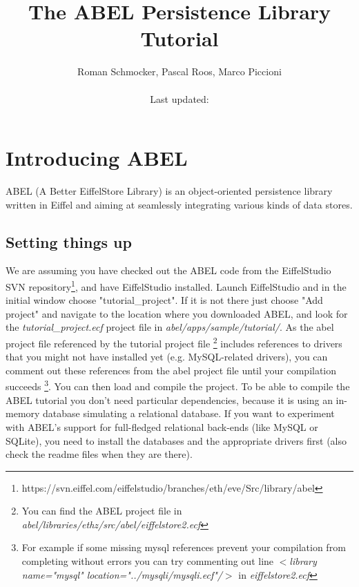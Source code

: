 \documentclass[a4paper,12pt]{report}
\title {The ABEL Persistence Library Tutorial}
\author {
	Roman Schmocker, Pascal Roos, Marco Piccioni\\\\
	Last updated:
}
\newcommand{\blankpage}{
\newpage
\thispagestyle{empty}
\mbox{}
\newpage
}
\begin{document}
\maketitle


%


\tableofcontents



%

\chapter{Introducing ABEL}
ABEL (A Better EiffelStore Library) is an object-oriented persistence library written in Eiffel and aiming at seamlessly integrating various kinds of data stores.
 
\section{Setting things up}
We are assuming you have checked out the ABEL code from the EiffelStudio SVN repository\footnote{https://svn.eiffel.com/eiffelstudio/branches/eth/eve/Src/library/abel}, and have EiffelStudio installed. Launch EiffelStudio and in the initial window choose "tutorial\_project". If it is not there just choose "Add project" and navigate to the location where you downloaded ABEL, and look for the \emph{tutorial\_project.ecf} project file in \emph{abel/apps/sample/tutorial/}. As the abel project file referenced by the tutorial project file \footnote{You can find the ABEL project file in \emph{abel/libraries/ethz/src/abel/eiffelstore2.ecf}} includes references to drivers that you might not have installed yet (e.g. MySQL-related drivers), you can comment out these references from the abel project file until your compilation succeeds \footnote{For example if some missing mysql references prevent your compilation from completing without errors you can try commenting out line \emph{$<$library name="mysql" location="../mysqli/mysqli.ecf"/$>$} in \emph{eiffelstore2.ecf}}. You can then load and compile the project. To be able to compile the ABEL tutorial you don't need particular dependencies, because it is using an in-memory database simulating a relational database. If you want to experiment with ABEL's support for full-fledged relational back-ends (like MySQL or SQLite), you need to install the databases and the appropriate drivers first (also check the readme files when they are there).
\end{document}
